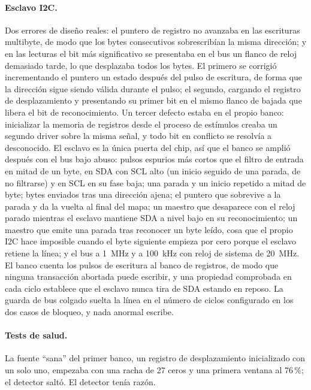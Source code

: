 \paragraph{Esclavo I2C.} Dos errores de diseño reales: el puntero de
registro no avanzaba en las escrituras multibyte, de modo que los bytes
consecutivos sobrescribían la misma dirección; y en las lecturas el bit
más significativo se presentaba en el bus un flanco de reloj demasiado
tarde, lo que desplazaba todos los bytes. El primero se corrigió
incrementando el puntero un estado después del pulso de escritura, de
forma que la dirección sigue siendo válida durante el pulso; el segundo,
cargando el registro de desplazamiento y presentando su primer bit en el
mismo flanco de bajada que libera el bit de reconocimiento. Un tercer
defecto estaba en el propio banco: inicializar la memoria de registros
desde el proceso de estímulos creaba un segundo driver sobre la misma
señal, y todo bit en conflicto se resolvía a desconocido. El esclavo es
la única puerta del chip, así que el banco se amplió después con el bus
bajo abuso: pulsos espurios más cortos que el filtro de entrada en mitad
de un byte, en SDA con SCL alto (un inicio seguido de una parada, de no
filtrarse) y en SCL en su fase baja; una parada y un inicio repetido a
mitad de byte; bytes enviados tras una dirección ajena; el puntero que
sobrevive a la parada y da la vuelta al final del mapa; un maestro que
desaparece con el reloj parado mientras el esclavo mantiene SDA a nivel
bajo en su reconocimiento; un maestro que emite una parada tras reconocer
un byte leído, cosa que el propio \ac{I2C} hace imposible cuando el byte
siguiente empieza por cero porque el esclavo retiene la línea; y el bus a
1~MHz y a 100~kHz con reloj de sistema de 20~MHz. El banco cuenta los
pulsos de escritura al banco de registros, de modo que ninguna
transacción abortada puede escribir, y una propiedad comprobada en cada
ciclo establece que el esclavo nunca tira de SDA estando en reposo. La
guarda de bus colgado suelta la línea en el número de ciclos configurado
en los dos casos de bloqueo, y nada anormal escribe.

\paragraph{Tests de salud.} La fuente ``sana'' del primer banco, un
registro de desplazamiento inicializado con un solo uno, empezaba con
una racha de 27 ceros y una primera ventana al 76\,\%; el detector saltó.
El detector tenía razón.

